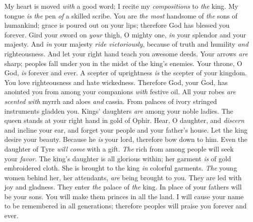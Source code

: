 \begin{biblechapter} %
 My heart is moved \textit{with} a good word; 
I recite my \textit{compositions} to \textit{the} king. 
My tongue \textit{is the} pen \textit{of} a skilled scribe.
\verse You are \textit{the most} handsome of \textit{the} sons of humankind; 
grace is poured out on your lips; 
therefore God has blessed you forever.
\verse Gird your sword on \textit{your} thigh, O mighty one, 
\textit{in} your splendor and your majesty.
\verse And \textit{in} your majesty \textit{ride victoriously}, 
because of truth and humility \textit{and} righteousness. 
And let your right hand teach you awesome deeds.
\verse Your arrows \textit{are} sharp; 
peoples fall under you 
in the midst of the king’s enemies.
\verse Your throne, O God, \textit{is} forever and ever. 
A scepter of uprightness \textit{is} 
the scepter of your kingdom.
\verse You love righteousness and hate wickedness. 
Therefore God, your God, has anointed you 
from among your companions \textit{with} festive oil.
\verse All your robes \textit{are scented with} myrrh and aloes \textit{and} cassia. 
From palaces of ivory stringed instruments gladden you.
\verse Kings’ daughters \textit{are} among your noble ladies. 
The queen stands at your right hand in gold of Ophir.
\verse Hear, O daughter, and \textit{discern} and incline your ear, 
and forget your people and your father’s house.
\verse Let the king desire your beauty. 
Because he \textit{is} your lord, therefore bow down to him.
\verse Even the daughter of Tyre \textit{will come} with a gift. 
\textit{The} rich from among people will seek your \textit{favor}.
\verse The king’s daughter is all glorious within; 
her garment \textit{is} of gold embroidered cloth.
\verse She is brought to the king \textit{in} colorful garments. 
\textit{The} young women behind her, her attendants, 
\textit{are} being brought to you.
\verse They are led with joy and gladness. 
They enter \textit{the} palace of \textit{the} king.
\verse In place of your fathers will be your sons. 
You will make them princes in all the land.
\verse I will cause your name to be remembered in all generations; 
therefore peoples will praise you forever and ever.
\end{biblechapter}


